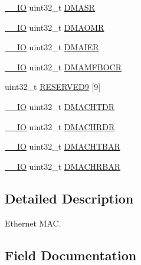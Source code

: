 \begin{DoxyCompactItemize}
\item 
\mbox{\hyperlink{core__sc300_8h_aec43007d9998a0a0e01faede4133d6be}{\+\_\+\+\_\+\+IO}} uint32\+\_\+t \mbox{\hyperlink{struct_e_t_h___type_def_a9e7c3d04e4dcf975939eeaac246b25d0}{D\+M\+A\+SR}}
\item 
\mbox{\hyperlink{core__sc300_8h_aec43007d9998a0a0e01faede4133d6be}{\+\_\+\+\_\+\+IO}} uint32\+\_\+t \mbox{\hyperlink{struct_e_t_h___type_def_aa15b972f30ee47f5df0d3ebc8866509d}{D\+M\+A\+O\+MR}}
\item 
\mbox{\hyperlink{core__sc300_8h_aec43007d9998a0a0e01faede4133d6be}{\+\_\+\+\_\+\+IO}} uint32\+\_\+t \mbox{\hyperlink{struct_e_t_h___type_def_add56f3652fd065c6797411e80477a064}{D\+M\+A\+I\+ER}}
\item 
\mbox{\hyperlink{core__sc300_8h_aec43007d9998a0a0e01faede4133d6be}{\+\_\+\+\_\+\+IO}} uint32\+\_\+t \mbox{\hyperlink{struct_e_t_h___type_def_a12eba1fc5d54aa50fdda201f7f9a84a3}{D\+M\+A\+M\+F\+B\+O\+CR}}
\item 
uint32\+\_\+t \mbox{\hyperlink{struct_e_t_h___type_def_ae7f5b577c875aae3016bf2478faaf62a}{R\+E\+S\+E\+R\+V\+E\+D9}} \mbox{[}9\mbox{]}
\item 
\mbox{\hyperlink{core__sc300_8h_aec43007d9998a0a0e01faede4133d6be}{\+\_\+\+\_\+\+IO}} uint32\+\_\+t \mbox{\hyperlink{struct_e_t_h___type_def_ab5bb348210fdd9a5538eb57abc5a5673}{D\+M\+A\+C\+H\+T\+DR}}
\item 
\mbox{\hyperlink{core__sc300_8h_aec43007d9998a0a0e01faede4133d6be}{\+\_\+\+\_\+\+IO}} uint32\+\_\+t \mbox{\hyperlink{struct_e_t_h___type_def_a9c49de2e699886d6604fd2b3d376a0e9}{D\+M\+A\+C\+H\+R\+DR}}
\item 
\mbox{\hyperlink{core__sc300_8h_aec43007d9998a0a0e01faede4133d6be}{\+\_\+\+\_\+\+IO}} uint32\+\_\+t \mbox{\hyperlink{struct_e_t_h___type_def_a900f9f888342fbdd8ee07e3ee1d4b73c}{D\+M\+A\+C\+H\+T\+B\+AR}}
\item 
\mbox{\hyperlink{core__sc300_8h_aec43007d9998a0a0e01faede4133d6be}{\+\_\+\+\_\+\+IO}} uint32\+\_\+t \mbox{\hyperlink{struct_e_t_h___type_def_acf3f7ecbf774d8d505655ac7f24761fc}{D\+M\+A\+C\+H\+R\+B\+AR}}
\end{DoxyCompactItemize}


\subsection{Detailed Description}
Ethernet M\+AC. 

\subsection{Field Documentation}
\mbox{\label{struct_e_t_h___type_def_ad1e11eb1200e64e0563e3576bf258194}} 
